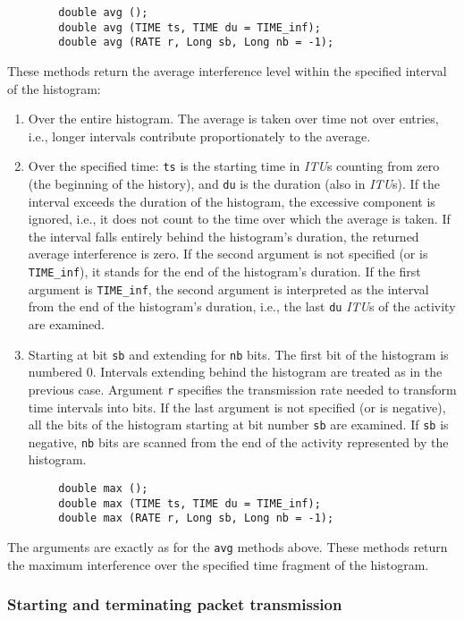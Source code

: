 \begin{verbatim}
        double avg ();
        double avg (TIME ts, TIME du = TIME_inf);
        double avg (RATE r, Long sb, Long nb = -1);
\end{verbatim}
\noindent
These methods return the average interference level within the specified
interval of the histogram:
\begin{enumerate}
\item
Over the entire histogram. 
The average is taken over time not over entries, i.e., longer intervals
contribute proportionately to the average.
\item
Over the specified time: {\tt ts} is the starting time in {\em ITU\/}s counting
from zero (the beginning of the history), and {\tt du} is the duration (also
in {\em ITU\/}s).
If the interval exceeds the duration of the histogram, the excessive
component is ignored, i.e., it does not count to the time over which the
average is taken.
If the interval falls entirely behind the histogram's duration, the returned
average interference is zero.
If the second argument is not specified (or is {\tt TIME\_inf}), it stands for
the end of the histogram's duration.
If the first argument is {\tt TIME\_inf}, the second argument is interpreted
as the interval from the end of the histogram's duration, i.e., the last
{\tt du} {\em ITU\/}s of the activity are examined.
\item
Starting at bit {\tt sb} and extending for {\tt nb} bits.
The first bit of the histogram is numbered 0.
Intervals extending behind the histogram are treated as in the previous case.
Argument {\tt r} specifies the transmission rate needed to transform
time intervals into bits.
If the last argument is not specified (or is negative), all the bits of the
histogram starting at bit number {\tt sb} are examined.
If {\tt sb} is negative, {\tt nb} bits are scanned from the end of the
activity represented by the histogram.
\end{enumerate}

\begin{verbatim}
        double max ();
        double max (TIME ts, TIME du = TIME_inf);
        double max (RATE r, Long sb, Long nb = -1);
\end{verbatim}
\noindent
The arguments are exactly as for the {\tt avg} methods above.
These methods return the maximum interference over the specified time fragment
of the histogram.

\subsubsection{Starting and terminating packet transmission}
\label{rm_tr_ac_st}

